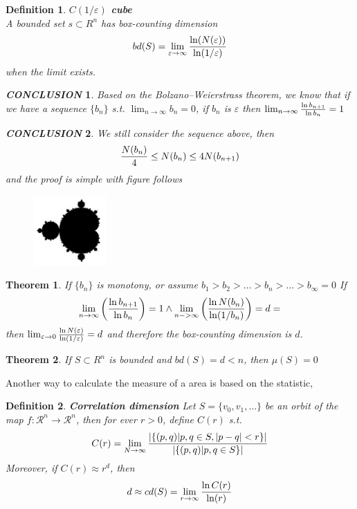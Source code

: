 \documentclass[12pt]{article}
\theoremstyle{plain}
\newtheorem{theorem}{\textbf{Theorem}}[section]
\newtheorem{definition}{{\color{red}\textbf{Definition}}}[section]
\newtheorem{conclusion}{\textit{\textbf{CONCLUSION}}}[section]
\begin{document}
\begin{definition}\textbf{$C(1/\varepsilon)$ cube}
\\\noindent A bounded set $s \subset R^n$ has box-counting dimension 
$$
bd(S) = \lim_{\varepsilon \rightarrow \infty} {\ln(N(\varepsilon)) \over \ln(1 /\varepsilon)}
$$
when the limit exists.
\end{definition}

\begin{conclusion}Based on the Bolzano–Weierstrass theorem, we know that if we have a sequence $\{b_n\}$ s.t. $\lim_{n \rightarrow \infty}b_n = 0$, if $b_n$ is $\varepsilon$ then $\lim_{n \rightarrow \infty}{\ln b_{n+1} \over \ln b_n} = 1$
\end{conclusion}


\begin{conclusion}We still consider the sequence above, then 
$$
{N(b_n) \over 4} \leq N(b_n) \leq 4N(b_{n+1})
$$
and the proof is simple with figure follows
\begin{figure}[H]
\begin{center}
\includegraphics[width=0.25\textwidth]{figure/section4/mandelbrot.png} \\
\end{center}
\end{figure}
\end{conclusion}

\begin{theorem} If $\{b_n\}$ is monotony, or assume $b_1 > b_2 > \ldots > b_n > \ldots > b_\infty = 0$ If
$$
\lim_{n \rightarrow \infty} \left(\ln b_{n+1} \over \ln b_n\right) = 1 \land \lim_{n - >\infty}\left({\ln N(b_n) \over \ln(1 / b_n)}\right) = d=
$$
then $\lim_{\varepsilon \rightarrow 0}{\ln N(\varepsilon) \over \ln (1 / \varepsilon)} = d$ and therefore the box-counting dimension is $d$.
\end{theorem}


\begin{theorem} If $S \subset R^n$ is bounded and $bd(S) = d < n$, then $\mu(S) = 0$
\end{theorem}


Another way to calculate the measure of a area is based on the statistic, 
\begin{definition}\textbf{Correlation dimension}
Let $S = \{v_0, v_1, \ldots\}$ be an orbit of the map $f: \mathcal R^n \rightarrow \mathcal R^n$, then for ever $r > 0$, define $C(r)$ s.t.
$$
C(r) = \lim_{N \rightarrow \infty}{\left|\left\{(p, q)| p, q \in S, |p - q| < r\right\}\right| \over \left|\left\{(p, q)| p, q \in S\right\}\right|}
$$
Moreover, if $C(r) \approx r^d$, then
$$
d \approx cd(S) = \lim_{r \rightarrow \infty}{\ln C(r) \over \ln(r)}
$$
\end{definition}
\end{document}
